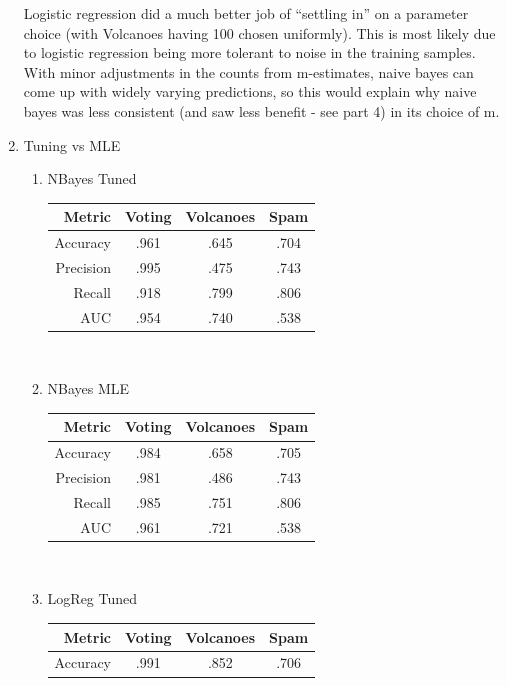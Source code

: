\documentclass[12pt]{article}
\begin{document}
\begin{enumerate}
        Logistic regression did a much better job of ``settling in'' on a
        parameter choice (with Volcanoes having 100 chosen uniformly). This is
        most likely due to logistic regression being more tolerant to noise in
        the training samples. With minor adjustments in the counts from
        m-estimates, naive bayes can come up with widely varying predictions,
        so this would explain why naive bayes was less consistent (and saw
        less benefit - see part 4) in its choice of m.
    \item Tuning vs MLE\\
        \begin{enumerate}
            \item NBayes Tuned\\
            \begin{tabular}{|r|c|c|c|}
                \hline
                Metric & Voting & Volcanoes & Spam\\ \hline
                Accuracy & .961 & .645 & .704 \\ \hline
                Precision & .995 & .475 & .743 \\ \hline
                Recall & .918 & .799 & .806 \\ \hline
                AUC & .954 & .740 & .538 \\ \hline
            \end{tabular}\\
            \item NBayes MLE\\
            \begin{tabular}{|r|c|c|c|}
                \hline
                Metric & Voting & Volcanoes & Spam\\ \hline
                Accuracy & .984 & .658 & .705 \\ \hline
                Precision & .981 & .486 & .743 \\ \hline
                Recall & .985 & .751 & .806 \\ \hline
                AUC & .961 & .721 & .538 \\ \hline
            \end{tabular}\\
            \item LogReg Tuned\\
            \begin{tabular}{|r|c|c|c|}
                \hline
                Metric & Voting & Volcanoes & Spam\\ \hline
                Accuracy & .991 & .852 & .706 \\ \hline

\end{tabular}
\end{enumerate}
\end{enumerate}
\end{document}
